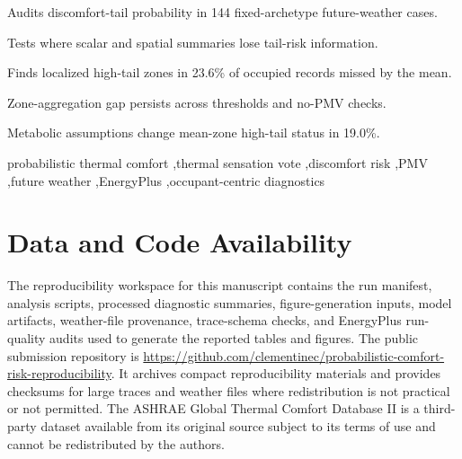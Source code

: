 \documentclass[preprint,3p,12pt]{elsarticle}
\begin{document}
\begin{frontmatter}
\begin{highlights}
\item Audits discomfort-tail probability in 144 fixed-archetype future-weather cases.
\item Tests where scalar and spatial summaries lose tail-risk information.
\item Finds localized high-tail zones in 23.6\% of occupied records missed by the mean.
\item Zone-aggregation gap persists across thresholds and no-PMV checks.
\item Metabolic assumptions change mean-zone high-tail status in 19.0\%.
\end{highlights}

\begin{keyword}
probabilistic thermal comfort \sep thermal sensation vote \sep discomfort risk \sep PMV \sep future weather \sep EnergyPlus \sep occupant-centric diagnostics
\end{keyword}

\end{frontmatter}





\clearpage


\section*{Data and Code Availability}
The reproducibility workspace for this manuscript contains the run manifest, analysis scripts, processed diagnostic summaries, figure-generation inputs, model artifacts, weather-file provenance, trace-schema checks, and EnergyPlus run-quality audits used to generate the reported tables and figures. The public submission repository is \url{https://github.com/clementinec/probabilistic-comfort-risk-reproducibility}. It archives compact reproducibility materials and provides checksums for large traces and weather files where redistribution is not practical or not permitted. The ASHRAE Global Thermal Comfort Database II is a third-party dataset available from its original source subject to its terms of use and cannot be redistributed by the authors.

\clearpage


\end{document}
